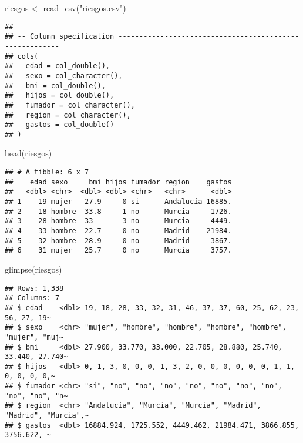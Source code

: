 \documentclass[
]{book}
\newenvironment{Shaded}{\begin{snugshade}}{\end{snugshade}}
\newcommand{\FunctionTok}[1]{\textcolor[rgb]{0.00,0.00,0.00}{#1}}
\newcommand{\NormalTok}[1]{#1}
\newcommand{\OtherTok}[1]{\textcolor[rgb]{0.56,0.35,0.01}{#1}}
\newcommand{\StringTok}[1]{\textcolor[rgb]{0.31,0.60,0.02}{#1}}
\begin{document}
\begin{Shaded}
\begin{Highlighting}[]
\NormalTok{riesgos }\OtherTok{\textless{}{-}} \FunctionTok{read\_csv}\NormalTok{(}\StringTok{"riesgos.csv"}\NormalTok{)}
\end{Highlighting}
\end{Shaded}

\begin{verbatim}
## 
## -- Column specification --------------------------------------------------------
## cols(
##   edad = col_double(),
##   sexo = col_character(),
##   bmi = col_double(),
##   hijos = col_double(),
##   fumador = col_character(),
##   region = col_character(),
##   gastos = col_double()
## )
\end{verbatim}

\begin{Shaded}
\begin{Highlighting}[]
\FunctionTok{head}\NormalTok{(riesgos)}
\end{Highlighting}
\end{Shaded}

\begin{verbatim}
## # A tibble: 6 x 7
##    edad sexo     bmi hijos fumador region    gastos
##   <dbl> <chr>  <dbl> <dbl> <chr>   <chr>      <dbl>
## 1    19 mujer   27.9     0 si      Andalucía 16885.
## 2    18 hombre  33.8     1 no      Murcia     1726.
## 3    28 hombre  33       3 no      Murcia     4449.
## 4    33 hombre  22.7     0 no      Madrid    21984.
## 5    32 hombre  28.9     0 no      Madrid     3867.
## 6    31 mujer   25.7     0 no      Murcia     3757.
\end{verbatim}

\begin{Shaded}
\begin{Highlighting}[]
\FunctionTok{glimpse}\NormalTok{(riesgos)}
\end{Highlighting}
\end{Shaded}

\begin{verbatim}
## Rows: 1,338
## Columns: 7
## $ edad    <dbl> 19, 18, 28, 33, 32, 31, 46, 37, 37, 60, 25, 62, 23, 56, 27, 19~
## $ sexo    <chr> "mujer", "hombre", "hombre", "hombre", "hombre", "mujer", "muj~
## $ bmi     <dbl> 27.900, 33.770, 33.000, 22.705, 28.880, 25.740, 33.440, 27.740~
## $ hijos   <dbl> 0, 1, 3, 0, 0, 0, 1, 3, 2, 0, 0, 0, 0, 0, 0, 1, 1, 0, 0, 0, 0,~
## $ fumador <chr> "si", "no", "no", "no", "no", "no", "no", "no", "no", "no", "n~
## $ region  <chr> "Andalucía", "Murcia", "Murcia", "Madrid", "Madrid", "Murcia",~
## $ gastos  <dbl> 16884.924, 1725.552, 4449.462, 21984.471, 3866.855, 3756.622, ~
\end{verbatim}
\end{document}
